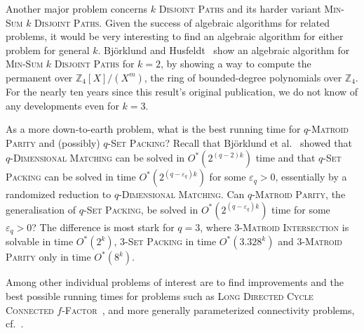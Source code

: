 \documentclass[10pt,a4paper]{article}
\begin{document}
Another major problem concerns \textsc{$k$ Disjoint Paths}
and its harder variant \textsc{Min-Sum $k$ Disjoint Paths}.
Given the success of algebraic algorithms for related problems,
it would be very interesting to find an algebraic algorithm for either problem
for general $k$. Björklund and Husfeldt~\cite{BjorklundH19twodp}
show an algebraic algorithm for \textsc{Min-Sum $k$ Disjoint Paths} for $k=2$, 
by showing a way to compute the permanent over $\mathbb{Z}_4[X]/(X^m)$, the ring
of bounded-degree polynomials over $\mathbb{Z}_4$. For the nearly ten years
since this result's original publication, we do not know of any developments
even for $k=3$. 

As a more down-to-earth problem, what is the best running time for
\textsc{$q$-Matroid Parity} and (possibly) \textsc{$q$-Set Packing}?
Recall that Björklund et al.~\cite{BjorklundHKK17narrow} showed that
\textsc{$q$-Dimensional Matching} can be solved in $O^*(2^{(q-2)k})$ time
and that \textsc{$q$-Set Packing} can be solved in time $O^*(2^{(q-\varepsilon_q)k})$
for some $\varepsilon_q > 0$, essentially by a randomized reduction to
\textsc{$q$-Dimensional Matching}.
Can \textsc{$q$-Matroid Parity}, the generalisation of \textsc{$q$-Set Packing},
be solved in $O^*(2^{(q-\varepsilon_q)k})$ time for some $\varepsilon_q > 0$?
The difference is most stark for $q=3$, where
\textsc{3-Matroid Intersection} is solvable in time $O^*(2^k)$, 
\textsc{3-Set Packing} in time $O^*(3.328^k)$
and \textsc{3-Matroid Parity} only in time $O^*(8^k)$. 

Among other individual problems of interest are to find improvements
and the best possible running times for problems such as 
\textsc{Long Directed Cycle}~\cite{FominLPS16JACM,Zehavi16ldc}
\textsc{Connected $f$-Factor}~\cite{FominGPS19sidma},
and more generally parameterized connectivity problems, cf.~\cite{AgrawalMPS22rSNDP,Feldmann0L22}.



\end{document}
